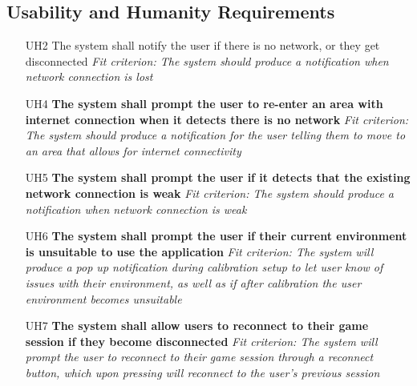 \documentclass{article}
\begin{document}
\subsection{Usability and Humanity Requirements}
\begin{enumerate}
    \item[UH2] The system shall notify the user if there is no network, or they get disconnected\newline
    \textit{Fit criterion: The system should produce a notification when network connection is lost}
    \item[UH4] \textbf{The system shall prompt the user to re-enter an area with internet connection when it detects there is no network}\newline
    \textit{Fit criterion: The system should produce a notification for the user telling them to move to an area that allows for internet connectivity}
    \item[UH5] \textbf{The system shall prompt the user if it detects that the existing network connection is weak}\newline
    \textit{Fit criterion: The system should produce a notification when network connection is weak}
    \item[UH6] \textbf{The system shall prompt the user if their current environment is unsuitable to use the application}\newline
    \textit{Fit criterion: The system will produce a pop up notification during calibration setup to let user know of issues with their environment, as well as if after calibration the user environment becomes unsuitable}
    \item[UH7] \textbf{The system shall allow users to reconnect to their game session if they become disconnected}\newline
    \textit{Fit criterion: The system will prompt the user to reconnect to their game session through a reconnect button, which upon pressing will reconnect to the user's previous session}
\end{enumerate}

\end{document}
